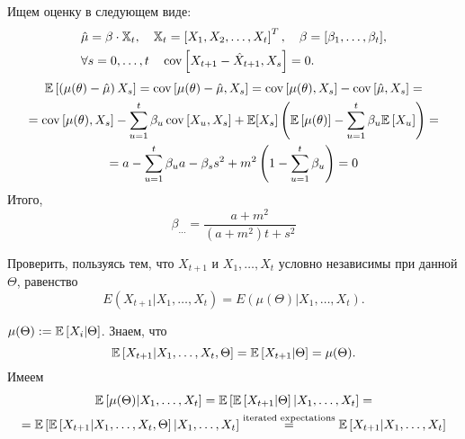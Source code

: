     \solution{}
        Ищем оценку в следующем виде:
        \begin{align}
            & \hat \mu = \beta \cdot \mathbb{X}_t, \quad \mathbb{X}_t = \left[X_1, X_2, \dots, X_t\right]^T, \quad \beta = [\beta_1, \dots, \beta_t], \\
            & \forall s = 0, \dots, t \quad \operatorname*{cov}\left[X_{t+1} - \hat X_{t+1}, X_s\right] = 0.
        \end{align}
        \begin{multline}
            \mathbb{E}\left[\left(\mu(\theta) -\hat \mu\right)X_s\right] = \operatorname*{cov}\left[\mu(\theta) -\hat \mu, X_s\right] = 
            \operatorname*{cov}\left[\mu(\theta), X_s\right] - \operatorname*{cov}\left[\hat \mu, X_s\right] = \\=
            \operatorname*{cov}\left[\mu(\theta), X_s\right] - \sum_{u = 1}^t\beta_u\operatorname*{cov}\left[X_u, X_s\right] + \mathbb{E}[X_s]\left(\mathbb{E}\left[\mu(\theta)\right] - \sum_{u=1}^{t}\beta_u\mathbb{E}\left[X_u\right]\right) = \\ =
            a - \sum_{u=1}^{t}\beta_ua - \beta_ss^2 +m^2\left(1 - \sum_{u=1}^{t}\beta_u\right) =0
        \end{multline}
        Итого,
        \begin{equation}
            \beta_{...} = \frac{a+m^2}{(a+m^2)t + s^2} 
        \end{equation}

    \problem{}
    Проверить, пользуясь тем, что $X_{t+1}$ и  $X_1,\dots,X_t$ условно независимы при данной $\Theta$,   равенство 
    $$ E(X_{t+1}|X_1,\dots,X_t)=E(\mu(\Theta)|X_1,\dots,X_t).$$ 
    
    \solution{}
        $\mu(\Theta) := \mathbb{E}\left[X_i\vert \Theta\right]$. Знаем, что
        \begin{equation}
            \mathbb{E}\left[X_{t+1} \vert X_1, \dots, X_t, \Theta\right] = \mathbb{E}\left[X_{t+1} \vert \Theta\right] = \mu(\Theta).
        \end{equation}
        Имеем
        \begin{multline}
            \mathbb{E}\left[\mu(\Theta)\vert X_1,\dots, X_t\right] = \mathbb{E}\left[ \mathbb{E}\left[X_{t+1} \vert \Theta\right]\vert X_1,\dots, X_t\right] = \\= 
            \mathbb{E}\left[ \mathbb{E}\left[X_{t+1} \vert X_1, \dots, X_t, \Theta\right] \vert X_1,\dots, X_t\right] \overset{\text{iterated expectations}}{=}  \mathbb{E}\left[X_{t+1}  \vert X_1,\dots, X_t\right]
        \end{multline}
